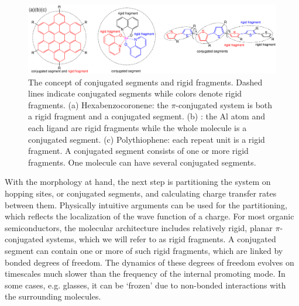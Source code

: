 \begin{figure}
\includegraphics[width=\linewidth]{fig/fragment_segment}
\caption{The concept of conjugated segments and rigid fragments. Dashed lines indicate conjugated segments while colors denote rigid fragments. (a) Hexabenzocoronene: the $\pi$-conjugated system is both a rigid fragment and a conjugated segment. (b) \Alq: the Al atom and each ligand are rigid fragments while the whole molecule is a conjugated segment. (c) Polythiophene: each repeat unit is a rigid fragment. A conjugated segment consists of one or more rigid fragments. One molecule can have several conjugated segments.}
\label{fig:segment}
\end{figure}

With the morphology at hand, the next step is partitioning the system on hopping sites, or conjugated segments, and calculating charge transfer rates between them. Physically intuitive arguments can be used for the partitioning,  which reflects the localization of the wave function of a charge. For most organic semiconductors, the molecular architecture includes relatively rigid, planar $\pi$-conjugated systems, which we will refer to as rigid fragments. A conjugated segment can contain one or more of such rigid fragments, which are linked by bonded degrees of freedom. The dynamics of these degrees of freedom evolves on timescales much slower than the frequency of the internal promoting mode. In some cases, e.g. glasses, it can be `frozen' due to non-bonded interactions with the surrounding molecules.

